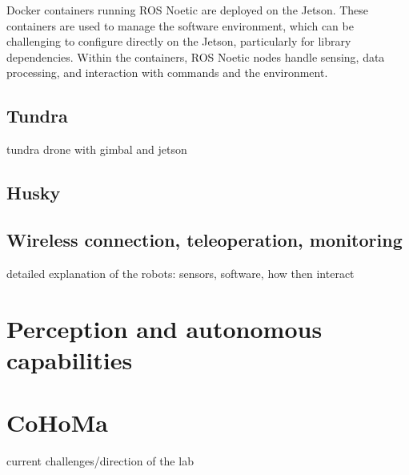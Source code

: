 
Docker containers running ROS Noetic are deployed on the Jetson.
These containers are used to manage the software environment, which can be challenging to configure directly on the Jetson, particularly for library dependencies.
Within the containers, ROS Noetic nodes handle sensing, data processing, and interaction with commands and the environment.

\subsection{Tundra}

tundra drone with gimbal and jetson

\subsection{Husky}

\subsection{Wireless connection, teleoperation, monitoring}

detailed explanation of the robots: sensors, software, how then interact


\section{Perception and autonomous capabilities}


\section{CoHoMa}

current challenges/direction of the lab
